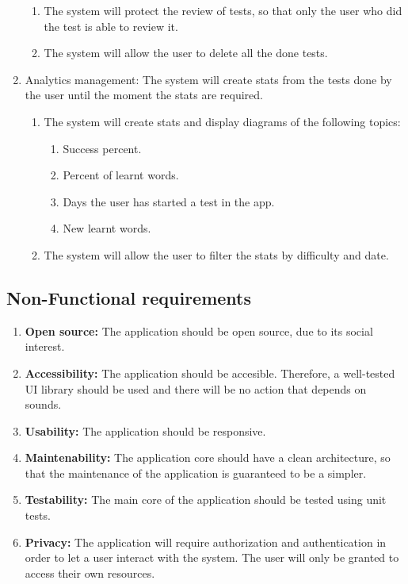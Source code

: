 \begin{enumerate}[label=\textbf{RF\_\arabic*}, align=left, leftmargin=*]
\begin{enumerate}[label=\textbf{\theenumi.\arabic*}, align=left, leftmargin=*]
            \item The system will protect the review of tests, so that only the user who did the test is able to review it.
            \item The system will allow the user to delete all the done tests.
        \end{enumerate}
    \item Analytics management: The system will create stats from the tests done by the user until the moment the stats are required.
        \begin{enumerate}[label=\textbf{\theenumi.\arabic*}, align=left, leftmargin=*]
            \item The system will create stats and display diagrams of the following topics:
                \begin{enumerate}
                    \item Success percent.
                    \item Percent of learnt words.
                    \item Days the user has started a test in the app.
                    \item New learnt words.
                \end{enumerate}
            \item The system will allow the user to filter the stats by difficulty and date.
        \end{enumerate}
\end{enumerate}

\subsection{Non-Functional requirements}
\begin{enumerate}[label=\textbf{RNF\_\arabic*}, align=left, leftmargin=*]
    \item \textbf{Open source:} The application should be open source, due to its social interest.
    \item \textbf{Accessibility: } The application should be accesible. Therefore, a well-tested UI library should be used and there will be no action that depends on sounds.
    \item \textbf{Usability:} The application should be responsive.
    \item \textbf{Maintenability:} The application core should have a clean architecture, so that the maintenance of the application is guaranteed to be a simpler.
    \item \textbf{Testability:} The main core of the application should be tested using unit tests.
    \item \textbf{Privacy:} The application will require authorization and authentication in order to let a user interact with the system. The user will only be granted to access their own resources.
\end{enumerate}

